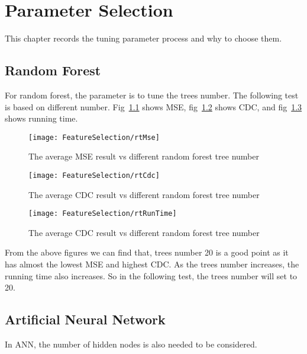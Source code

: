 \chapter{Parameter Selection}
\label{ch:parameter_selection}

This chapter records the tuning parameter process and why to choose them.

\section{Random Forest}
For random forest, the parameter is to tune the trees number. The following test is based on different number. Fig~\ref{fg:rtMseDF} shows MSE, fig~\ref{fg:rtCdcDF} shows CDC, and fig~\ref{fg:rtRunTimeDF} shows running time.

\begin{figure}[h]
	\centering
	\texttt{[image: FeatureSelection/rtMse]}
	\caption{The average MSE result vs different random forest tree number}
	\label{fg:rtMseDF}
\end{figure}

\begin{figure}[h]
	\centering
	\texttt{[image: FeatureSelection/rtCdc]}
	\caption{The average CDC result vs different random forest tree number}
	\label{fg:rtCdcDF}
\end{figure}

\begin{figure}[h]
\centering
\texttt{[image: FeatureSelection/rtRunTime]}
\caption{The average CDC result vs different random forest tree number}
\label{fg:rtRunTimeDF}
\end{figure}

From the above figures we can find that, trees number 20 is a good point as it has almost the lowest MSE and highest CDC. As the trees number increases, the running time also increases. So in the following test, the trees number will set to 20.

\section{Artificial Neural Network}
In ANN, the number of hidden nodes is also needed to be considered. 